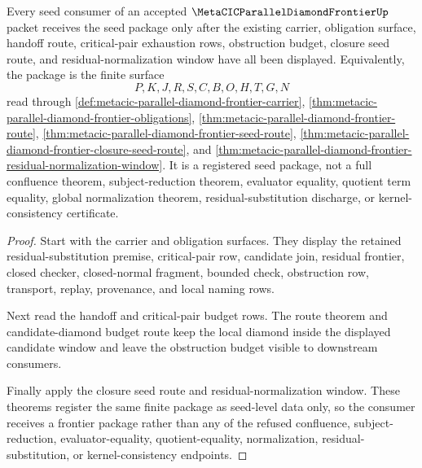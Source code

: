 \begin{theorem}
\label{thm:metacic-parallel-diamond-frontier-seed-package}
Every seed consumer of an accepted $\MetaCICParallelDiamondFrontierUp$ packet receives the seed package only after the existing carrier, obligation surface, handoff route, critical-pair exhaustion rows, obstruction budget, closure seed route, and residual-normalization window have all been displayed. Equivalently, the package is the finite surface
$$
P,K,J,R,S,C,B,O,H,T,G,N
$$
read through \autoref{def:metacic-parallel-diamond-frontier-carrier}, \autoref{thm:metacic-parallel-diamond-frontier-obligations}, \autoref{thm:metacic-parallel-diamond-frontier-route}, \autoref{thm:metacic-parallel-diamond-frontier-seed-route}, \autoref{thm:metacic-parallel-diamond-frontier-closure-seed-route}, and \autoref{thm:metacic-parallel-diamond-frontier-residual-normalization-window}. It is a registered seed package, not a full confluence theorem, subject-reduction theorem, evaluator equality, quotient term equality, global normalization theorem, residual-substitution discharge, or kernel-consistency certificate.
\end{theorem}
\begin{proof}
Start with the carrier and obligation surfaces. They display the retained residual-substitution premise, critical-pair row, candidate join, residual frontier, closed checker, closed-normal fragment, bounded check, obstruction row, transport, replay, provenance, and local naming rows.

Next read the handoff and critical-pair budget rows. The route theorem and candidate-diamond budget route keep the local diamond inside the displayed candidate window and leave the obstruction budget visible to downstream consumers.

Finally apply the closure seed route and residual-normalization window. These theorems register the same finite package as seed-level data only, so the consumer receives a frontier package rather than any of the refused confluence, subject-reduction, evaluator-equality, quotient-equality, normalization, residual-substitution, or kernel-consistency endpoints.
\end{proof}
